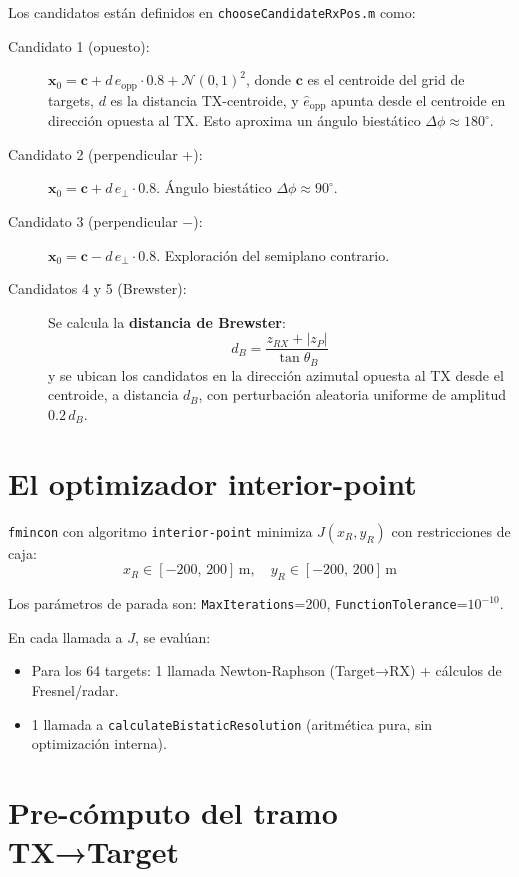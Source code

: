\documentclass[12pt,a4paper,oneside]{book}
\newcommand{\thetaB}{\theta_B}
\begin{document}
Los candidatos están definidos en \texttt{chooseCandidateRxPos.m} como:

\begin{description}
  \item[Candidato 1 (opuesto):] $\mathbf{x}_0 = \mathbf{c} + d\,\hat{e}_{\text{opp}} \cdot 0.8 + \mathcal{N}(0,1)^2$, donde $\mathbf{c}$ es el centroide del grid de targets, $d$ es la distancia TX-centroide, y $\hat{e}_{\text{opp}}$ apunta desde el centroide en dirección opuesta al TX. Esto aproxima un ángulo biestático $\Delta\phi \approx 180^\circ$.

  \item[Candidato 2 (perpendicular +):] $\mathbf{x}_0 = \mathbf{c} + d\,\hat{e}_{\perp} \cdot 0.8$. Ángulo biestático $\Delta\phi \approx 90^\circ$.

  \item[Candidato 3 (perpendicular $-$):] $\mathbf{x}_0 = \mathbf{c} - d\,\hat{e}_{\perp} \cdot 0.8$. Exploración del semiplano contrario.

  \item[Candidatos 4 y 5 (Brewster):] Se calcula la \textbf{distancia de Brewster}:
  \[
  d_B = \frac{z_{RX} + |z_P|}{\tan\thetaB}
  \]
  y se ubican los candidatos en la dirección azimutal opuesta al TX desde el centroide, a distancia $d_B$, con perturbación aleatoria uniforme de amplitud $0.2\,d_B$.
\end{description}

\section{El optimizador interior-point}

\texttt{fmincon} con algoritmo \texttt{interior-point} minimiza $J(x_R, y_R)$ con restricciones de caja:
\[
x_R \in [-200,\,200]\,\text{m}, \quad y_R \in [-200,\,200]\,\text{m}
\]

Los parámetros de parada son: \texttt{MaxIterations}=200, \texttt{FunctionTolerance}=$10^{-10}$.

En cada llamada a $J$, se evalúan:
\begin{itemize}
  \item Para los 64 targets: 1 llamada Newton-Raphson (Target→RX) + cálculos de Fresnel/radar.
  \item 1 llamada a \texttt{calculateBistaticResolution} (aritmética pura, sin optimización interna).
\end{itemize}

\section{Pre-cómputo del tramo TX→Target}
\end{document}
